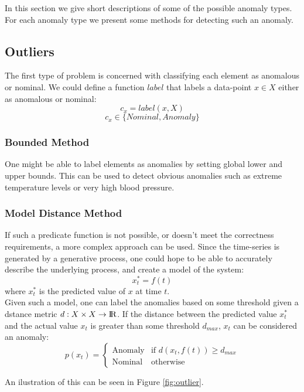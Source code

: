 \documentclass[a4paper, 10pt]{article}
\begin{document}
In this section we give short descriptions of some of the possible anomaly types. For each anomaly type we present some methods for detecting such an anomaly.

\subsection{Outliers}

The first type of problem is concerned with classifying each element as anomalous or nominal. We could define a function $label$ that labels a data-point $x \in X$ either as anomalous or nominal:
$$c_x = label(x,X)$$
$$c_x \in \{Nominal, Anomaly\}$$

\subsubsection{Bounded Method}

One might be able to label elements as anomalies by setting global lower and upper bounds. This can be used to detect obvious anomalies such as extreme temperature levels or very high blood pressure.

\subsubsection{Model Distance Method}

If such a predicate function is not possible, or doesn't meet the correctness requirements, a more complex approach can be used. Since the time-series is generated by a generative process, one could hope to be able to accurately describe the underlying process, and create a model of the system:
$$x_t^* = f(t)$$
where $x_t^*$ is the predicted value of $x$ at time $t$. \\

Given such a model, one can label the anomalies based on some threshold given a dstance metric $d: X \times X \rightarrow {\rm I\!R}$. If the distance between the predicted value $x_t^*$ and the actual value $x_t$ is greater than some threshold $d_{max}$, $x_t$ can be considered an anomaly:
$$
    p(x_t) =
        \begin{cases}
            \text{Anomaly} & \text{if } d(x_t, f(t)) \ge d_{max} \\
            \text{Nominal} & \text{otherwise}
        \end{cases}
$$

An ilustration of this can be seen in Figure \ref{fig:outlier}. \\
\end{document}
